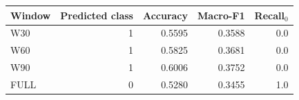 \small
\setlength{\tabcolsep}{4pt}
\begin{tabular}{@{}lrrrr@{}}
\toprule
Window & Predicted class & Accuracy & Macro-F1 & Recall$_0$ \\
\midrule
W30 & 1 & 0.5595 & 0.3588 & 0.0 \\
W60 & 1 & 0.5825 & 0.3681 & 0.0 \\
W90 & 1 & 0.6006 & 0.3752 & 0.0 \\
FULL & 0 & 0.5280 & 0.3455 & 1.0 \\
\bottomrule
\end{tabular}
